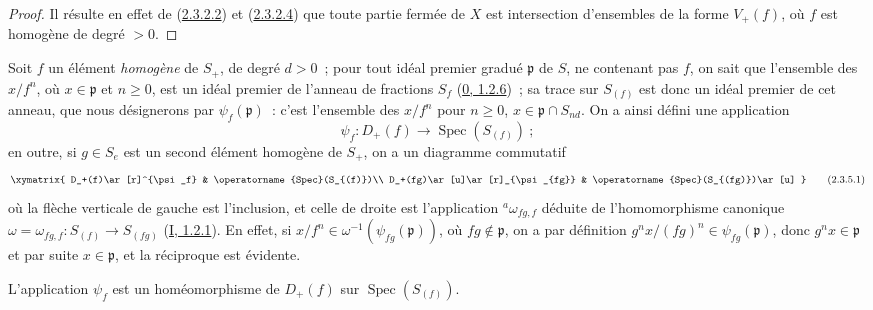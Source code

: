 \begin{proof}
Il résulte en effet de (\hyperref[II.2.3.2.2-fr]{2.3.2.2}) et
(\hyperref[II.2.3.2.4-fr]{2.3.2.4}) que toute partie fermée de $X$ est
intersection d'ensembles de la forme $V_+(f)$, où $f$ est homogène de degré
$>0$.
\end{proof}

\begin{env}[2.3.5]
\label{II.2.3.5-fr}
Soit $f$ un élément \emph{homogène} de $S_+$, de degré $d>0$~; pour tout
idéal premier gradué $\mathfrak{p}$ de $S$, ne contenant pas $f$, on sait
que l'ensemble des $x/f^n$, où $x\in\mathfrak{p}$ et $n\geq 0$, est un
idéal premier de l'anneau de fractions $S_f$
(\hyperref[0.1.2.6-fr]{0, 1.2.6})~; sa trace sur $S_{(f)}$ est donc un idéal
premier de cet anneau, que nous désignerons par
$\psi_f(\mathfrak{p})$~: c'est l'ensemble des $x/f^n$ pour $n\geq 0$,
$x\in\mathfrak{p}\cap S_{nd}$. On a ainsi défini une application
\[
  \psi_f:D_+(f)\longrightarrow\operatorname{Spec}(S_{(f)})~;
\]
en outre, si $g\in S_e$ est un second élément homogène de $S_+$, on a un
diagramme commutatif
\[
  \label{II.2.3.5.1-fr}
  \xymatrix{
    D_+(f)\ar[r]^{\psi_f}
    & \operatorname{Spec}(S_{(f)})\\
    D_+(fg)\ar[u]\ar[r]_{\psi_{fg}}
    & \operatorname{Spec}(S_{(fg)})\ar[u]
  }
  \tag{2.3.5.1}
\]
où la flèche verticale de gauche est l'inclusion, et celle de droite est
l'application ${}^a\omega_{fg,f}$ déduite de l'homomorphisme canonique
$\omega=\omega_{fg,f}:S_{(f)}\to S_{(fg)}$
(\hyperref[I.1.2.1-fr]{I, 1.2.1}). En effet, si
$x/f^n\in\omega^{-1}(\psi_{fg}(\mathfrak{p}))$, où
$fg\notin\mathfrak{p}$, on a par définition
$g^n x/(fg)^n\in\psi_{fg}(\mathfrak{p})$, donc
$g^n x\in\mathfrak{p}$ et par suite $x\in\mathfrak{p}$, et la réciproque
est évidente.
\end{env}

\begin{proposition}[2.3.6]
\label{II.2.3.6-fr}
L'application $\psi_f$ est un homéomorphisme de $D_+(f)$ sur
$\operatorname{Spec}(S_{(f)})$.
\end{proposition}

